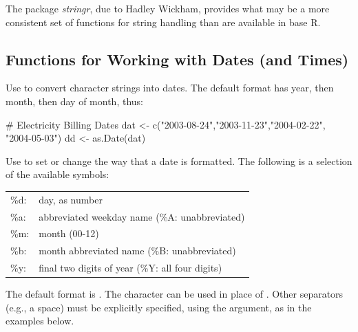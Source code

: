 The package {\em stringr}, due to Hadley Wickham, provides what may
be a more consistent set of functions for string handling than are
available in base R.

\subsection{Functions for Working with Dates (and Times)}\label{ss:dates}


Use  to convert character strings into dates.  The
default format has year, then month, then day of month, thus:
\begin{Schunk}
\begin{Sinput}
# Electricity Billing Dates
dat <- c("2003-08-24","2003-11-23","2004-02-22",
         "2004-05-03")
dd <- as.Date(dat)
\end{Sinput}
\end{Schunk}

Use  to set or change the way that a date is
formatted.  The following is a selection of the available symbols:
\vspace*{6pt}

\begin{tabular}{ll}
\%d: & day, as number\\
\%a: & abbreviated weekday name (\%A: unabbreviated)\\
\%m: & month (00-12)\\
\%b: & month abbreviated name (\%B: unabbreviated)\\
\%y: & final two digits of year (\%Y: all four digits)\\
\end{tabular}
\vspace*{6pt}

The default format is .  The character
\txtt{/} can be used in place of \txtt{-}.  Other separators
(e.g., a space) must be explicitly specified, using the
 argument, as in the examples below.

